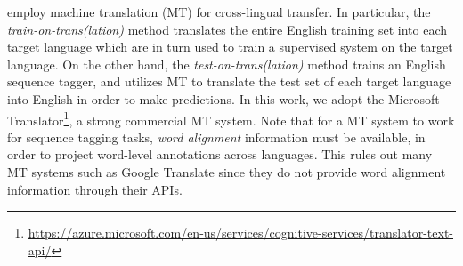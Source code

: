 \documentclass[11pt,a4paper]{article}
\newcommand{\newterm}[1]{{\bf #1}}
\begin{document}
\noindent\newterm{MT baselines} employ machine translation (MT) for cross-lingual transfer.
In particular, the \emph{train-on-trans(lation)} method translates the entire English training set into each target language which are in turn used to train a supervised system on the target language.
On the other hand, the \emph{test-on-trans(lation)} method trains an English sequence tagger, and utilizes MT to translate the test set of each target language into English in order to make predictions.
In this work, we adopt the Microsoft Translator\footnote{\url{https://azure.microsoft.com/en-us/services/cognitive-services/translator-text-api/}}, a strong commercial MT system.
Note that for a MT system to work for sequence tagging tasks, \emph{word alignment} information must be available, in order to project word-level annotations across languages.
This rules out many MT systems such as Google Translate since they do not provide word alignment information through their APIs.
\end{document}
